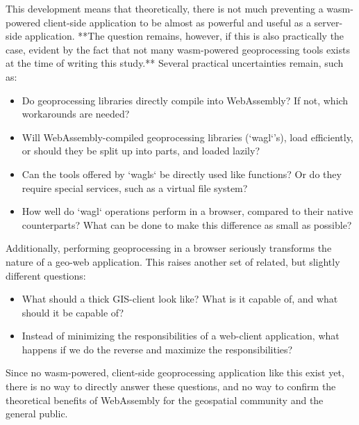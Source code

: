This development means that theoretically, there is not much preventing a wasm-powered client-side application to be almost as powerful and useful as a server-side application. **The question remains, however, if this is also practically the case, evident by the fact that not many wasm-powered geoprocessing tools exists at the time of writing this study.** Several practical uncertainties remain, such as: 
\begin{itemize}
  \item Do geoprocessing libraries directly compile into WebAssembly? If not, which workarounds are needed? 
  \item Will WebAssembly-compiled geoprocessing libraries (`wagl`'s), load efficiently, or should they be split up into parts, and loaded lazily? 
  \item Can the tools offered by `wagls` be directly used like functions? Or do they require special services, such as a virtual file system? 
  \item How well do `wagl` operations perform in a browser, compared to their native counterparts? What can be done to make this difference as small as possible?
\end{itemize}

Additionally, performing geoprocessing in a browser seriously transforms the nature of a geo-web application. This raises another set of related, but slightly different questions:

\begin{itemize}
  \item What should a thick GIS-client look like? What is it capable of, and what should it be capable of?
  \item Instead of minimizing the responsibilities of a web-client application, what happens if we do the reverse and maximize the responsibilities? 
\end{itemize}


Since no wasm-powered, client-side geoprocessing application like this exist yet, there is no way to directly answer these questions, and no way to confirm the theoretical benefits of WebAssembly for the geospatial community and the general public.
